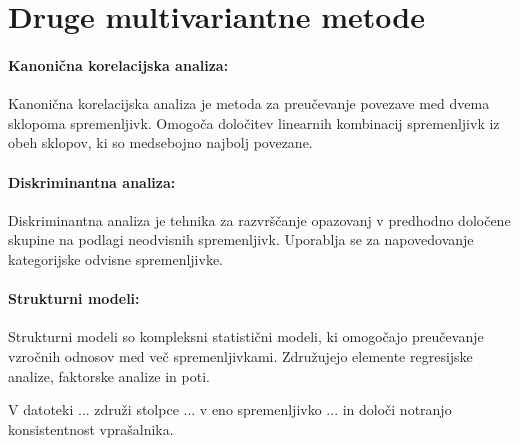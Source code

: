 \section{Druge multivariantne metode}

\paragraph{Kanonična korelacijska analiza:}
Kanonična korelacijska analiza je metoda za preučevanje povezave med dvema sklopoma spremenljivk. Omogoča določitev linearnih kombinacij spremenljivk iz obeh sklopov, ki so medsebojno najbolj povezane.

\paragraph{Diskriminantna analiza:}
Diskriminantna analiza je tehnika za razvrščanje opazovanj v predhodno določene skupine na podlagi neodvisnih spremenljivk. Uporablja se za napovedovanje kategorijske odvisne spremenljivke.

\paragraph{Strukturni modeli:}
Strukturni modeli so kompleksni statistični modeli, ki omogočajo preučevanje vzročnih odnosov med več spremenljivkami. Združujejo elemente regresijske analize, faktorske analize in poti.

\begin{Vaje}{1}
    V datoteki ... združi stolpce ... v eno spremenljivko ... in določi notranjo konsistentnost vprašalnika.
\end{Vaje}
